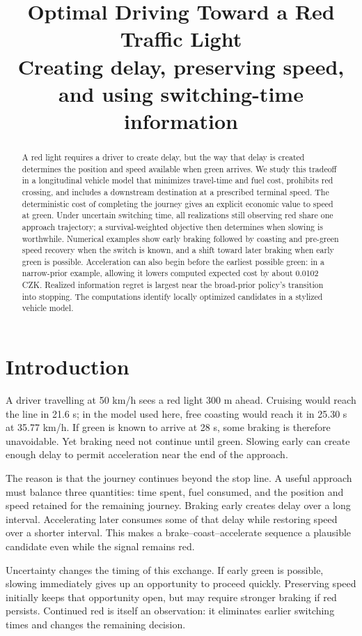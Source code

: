 \documentclass[journal,a4paper,twocolumn]{IEEEtran}
\title{Optimal Driving Toward a Red Traffic Light\\[3pt]
\large Creating delay, preserving speed, and using switching-time information}
\begin{document}
\maketitle

\begin{abstract}
A red light requires a driver to create delay, but the way that delay is created determines the position and speed available when green arrives. We study this tradeoff in a longitudinal vehicle model that minimizes travel-time and fuel cost, prohibits red crossing, and includes a downstream destination at a prescribed terminal speed. The deterministic cost of completing the journey gives an explicit economic value to speed at green. Under uncertain switching time, all realizations still observing red share one approach trajectory; a survival-weighted objective then determines when slowing is worthwhile. Numerical examples show early braking followed by coasting and pre-green speed recovery when the switch is known, and a shift toward later braking when early green is possible. Acceleration can also begin before the earliest possible green: in a narrow-prior example, allowing it lowers computed expected cost by about 0.0102 CZK. Realized information regret is largest near the broad-prior policy's transition into stopping. The computations identify locally optimized candidates in a stylized vehicle model.
\end{abstract}

\section{Introduction}
A driver travelling at 50 km/h sees a red light 300 m ahead. Cruising would reach the line in 21.6 s; in the model used here, free coasting would reach it in 25.30 s at 35.77 km/h. If green is known to arrive at 28 s, some braking is therefore unavoidable. Yet braking need not continue until green. Slowing early can create enough delay to permit acceleration near the end of the approach.

The reason is that the journey continues beyond the stop line. A useful approach must balance three quantities: time spent, fuel consumed, and the position and speed retained for the remaining journey. Braking early creates delay over a long interval. Accelerating later consumes some of that delay while restoring speed over a shorter interval. This makes a brake--coast--accelerate sequence a plausible candidate even while the signal remains red.

Uncertainty changes the timing of this exchange. If early green is possible, slowing immediately gives up an opportunity to proceed quickly. Preserving speed initially keeps that opportunity open, but may require stronger braking if red persists. Continued red is itself an observation: it eliminates earlier switching times and changes the remaining decision.
\end{document}
